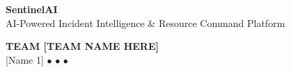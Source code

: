 \documentclass[aspectratio=169, xcolor=table]{beamer}
\begin{document}
\begin{frame}[plain]
    \begin{center}
        \vspace*{1.5cm}
        {\Huge \textbf{\textcolor{SentinelAccent}{Sentinel}AI}} \\
        \vspace{0.4cm}
        {\Large AI-Powered Incident Intelligence \& Resource Command Platform} \\
        \vspace{1.5cm}
        
        \begin{tcolorbox}[sentinelcard, width=0.8\textwidth, center, colback=SentinelBg, colframe=SentinelSurfaceRaised]
            \centering
            \textcolor{SentinelTextSec}{\textbf{TEAM [TEAM NAME HERE]}} \\
            \vspace{0.3cm}
            [Name 1] \quad $\bullet$ \quad [Name 2] \quad $\bullet$ \quad [Name 3] \quad $\bullet$ \quad [Name 4]
        \end{tcolorbox}
    \end{center}
\end{frame}
\end{document}
